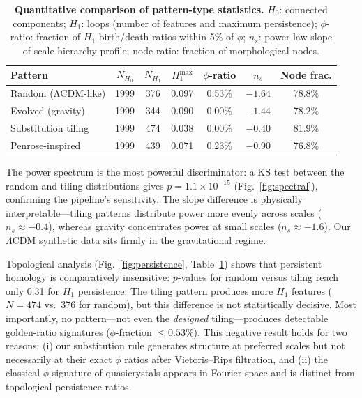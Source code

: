 \documentclass[12pt,a4paper]{article}
\begin{document}
\begin{table}[htbp]
  \centering
  \caption{\textbf{Quantitative comparison of pattern-type statistics.}
    $H_0$: connected components; $H_1$: loops (number of features and maximum
    persistence); $\phi$-ratio: fraction of $H_1$ birth/death ratios within
    5\% of $\phi$; $n_s$: power-law slope of scale hierarchy profile; node
    ratio: fraction of morphological nodes.}
  \label{tab:comparison}
  \renewcommand{\arraystretch}{1.25}
  \begin{tabular}{lcccccc}
    \toprule
    Pattern & $N_{H_0}$ & $N_{H_1}$ & $H_1^\mathrm{max}$ & $\phi$-ratio
            & $n_s$ & Node frac.\\
    \midrule
    Random (ΛCDM-like) & 1999 & 376 & 0.097 & 0.53\% & $-1.64$ & 78.8\%\\
    Evolved (gravity)  & 1999 & 344 & 0.090 & 0.00\% & $-1.44$ & 78.2\%\\
    Substitution tiling & 1999 & 474 & 0.038 & 0.00\% & $-0.40$ & 81.9\%\\
    Penrose-inspired    & 1999 & 439 & 0.071 & 0.23\% & $-0.90$ & 76.8\%\\
    \bottomrule
  \end{tabular}
\end{table}

The power spectrum is the most powerful discriminator: a KS test between the
random and tiling distributions gives $p = 1.1 \times 10^{-15}$
(Fig.~\ref{fig:spectral}), confirming the pipeline's sensitivity.
The slope difference is physically interpretable---tiling patterns distribute
power more evenly across scales ($n_s \approx -0.4$), whereas gravity
concentrates power at small scales ($n_s \approx -1.6$).  Our $\Lambda$CDM
synthetic data sits firmly in the gravitational regime.

Topological analysis (Fig.~\ref{fig:persistence}, Table~\ref{tab:comparison})
shows that persistent homology is comparatively insensitive: $p$-values for
random versus tiling reach only 0.31 for $H_1$ persistence.  The tiling pattern
produces more $H_1$ features ($N = 474$ vs.\ 376 for random), but this
difference is not statistically decisive.  Most importantly, no pattern---not
even the \emph{designed} tiling---produces detectable golden-ratio signatures
($\phi$-fraction $\leq 0.53\%$).  This negative result holds for two reasons:
(i) our substitution rule generates structure at preferred scales but not
necessarily at their exact $\phi$ ratios after Vietoris--Rips filtration, and
(ii) the classical $\phi$ signature of quasicrystals appears in Fourier space
and is distinct from topological persistence ratios.
\end{document}
